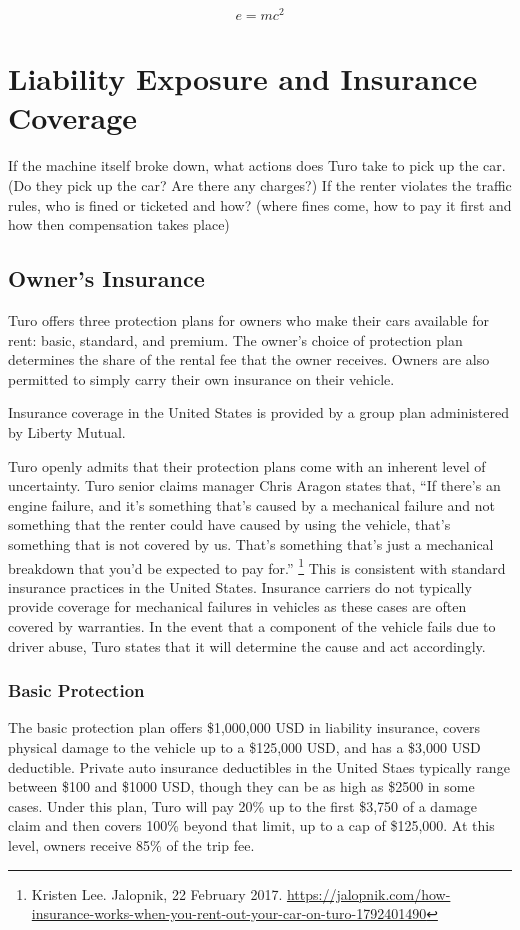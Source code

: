 \documentclass[preprint,12pt]{elsarticle}
\begin{document}
\begin{equation}
\label{eq:emc}
e = mc^2
\end{equation}

\section{Liability Exposure and Insurance Coverage}
\label{S:2}


If the machine itself broke down, what actions does Turo take to pick up the car. (Do they pick up the car? Are there any charges?)
If the renter violates the traffic rules, who is fined or ticketed and how? (where fines come, how to pay it first and how then compensation takes place)

\subsection{Owner's Insurance}
Turo offers three protection plans for owners who make their cars available for rent: basic, standard, and premium. The owner's choice of protection plan determines the share of the rental fee that the owner receives. Owners are also permitted to simply carry their own insurance on their vehicle.

Insurance coverage in the United States is provided by a group plan administered by Liberty Mutual.

Turo openly admits that their protection plans come with an inherent level of uncertainty. Turo senior claims manager Chris Aragon states that, ``If there’s an engine failure, and it’s something that’s caused by a mechanical failure and not something that the renter could have caused by using the vehicle, that’s something that is not covered by us. That’s something that’s just a mechanical breakdown that you’d be expected to pay for.''
  \footnote{
  Kristen Lee. Jalopnik, 22 February 2017. \url{https://jalopnik.com/how-insurance-works-when-you-rent-out-your-car-on-turo-1792401490}
  }
This is consistent with standard insurance practices in the United States. Insurance carriers do not typically provide coverage for mechanical failures in vehicles as these cases are often covered by warranties. In the event that a component of the vehicle fails due to driver abuse, Turo states that it will determine the cause and act accordingly.

\subsubsection{Basic Protection}
The basic protection plan offers \$1,000,000 USD in liability insurance, covers physical damage to the vehicle up to a \$125,000 USD, and has a \$3,000 USD deductible. Private auto insurance deductibles in the United Staes typically range between \$100 and \$1000 USD, though they can be as high as \$2500 in some cases. Under this plan, Turo will pay 20\% up to the first \$3,750 of a damage claim and then covers 100\% beyond that limit, up to a cap of \$125,000. At this level, owners receive 85\% of the trip fee.
\end{document}
